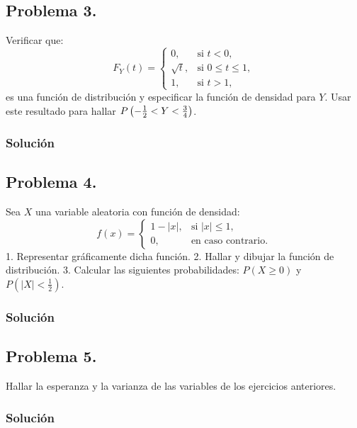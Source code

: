 \documentclass[
]{article}
\begin{document}
\hypertarget{problema-3.-1}{%
\subsection{Problema 3.}\label{problema-3.-1}}

Verificar que: \[
F_Y(t)=
\left\{\begin{array}{ll}
0, & \mbox{si $t<0$},\\
\sqrt{t}, & \mbox{si $0\leq t\leq 1$},\\ 1, &
\mbox{si $t>1$},
\end{array}\right.
\] es una función de distribución y especificar la función de densidad
para \(Y\). Usar este resultado para hallar
\(P\left(-{1\over 2}<Y<{3\over 4}\right)\).

\hypertarget{soluciuxf3n-8}{%
\subsubsection{Solución}\label{soluciuxf3n-8}}

\hypertarget{problema-4.-1}{%
\subsection{Problema 4.}\label{problema-4.-1}}

Sea \(X\) una variable aleatoria con función de densidad: \[
f(x)=\begin{cases}
1-|x|, & \mbox{si }|x|\leq 1,\\
0, & \mbox{en caso contrario.}
\end{cases}
\] 1. Representar gráficamente dicha función. 2. Hallar y dibujar la
función de distribución. 3. Calcular las siguientes probabilidades:
\(P(X\geq 0)\) y \(P\left(|X|<\frac{1}{2}\right).\)

\hypertarget{soluciuxf3n-9}{%
\subsubsection{Solución}\label{soluciuxf3n-9}}

\hypertarget{problema-5.-1}{%
\subsection{Problema 5.}\label{problema-5.-1}}

Hallar la esperanza y la varianza de las variables de los ejercicios
anteriores.

\hypertarget{soluciuxf3n-10}{%
\subsubsection{Solución}\label{soluciuxf3n-10}}
\end{document}
